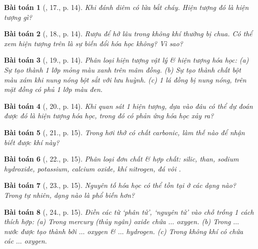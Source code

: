 \documentclass{article}
\newtheorem{baitoan}{Bài toán}
\begin{document}
\begin{baitoan}[\cite{An_Hoa_Hoc_nang_cao_8_9}, 17., p. 14]
	Khi đánh diêm có lửa bắt cháy. Hiện tượng đó là hiện tượng gì?
\end{baitoan}

\begin{baitoan}[\cite{An_Hoa_Hoc_nang_cao_8_9}, 18., p. 14]
	Rượu để hở lâu trong không khí thường bị chua. Có thể xem hiện tượng trên là sự biến đổi hóa học không? Vì sao?
\end{baitoan}

\begin{baitoan}[\cite{An_Hoa_Hoc_nang_cao_8_9}, 19., p. 14]
	Phân loại hiện tượng vật lý \& hiện tượng hóa học: (a) Sự tạo thành 1 lớp mỏng màu xanh trên mâm đồng. (b) Sự tạo thành chất bột màu xám khi nung nóng bột sắt với lưu huỳnh. (c) 1 lá đồng bị nung nóng, trên mặt đồng có phủ 1 lớp màu đen.
\end{baitoan}

\begin{baitoan}[\cite{An_Hoa_Hoc_nang_cao_8_9}, 20., p. 14]
	Khi quan sát 1 hiện tượng, dựa vào đâu có thể dự đoán được đó là hiện tượng hóa học, trong đó có phản ứng hóa học xảy ra?
\end{baitoan}

\begin{baitoan}[\cite{An_Hoa_Hoc_nang_cao_8_9}, 21., p. 15]
	Trong hơi thở có chất carbonic, làm thế nào để nhận biết được khí này?
\end{baitoan}

\begin{baitoan}[\cite{An_Hoa_Hoc_nang_cao_8_9}, 22., p. 15]
	Phân loại đơn chất \& hợp chất: silic, than, sodium hydroxide, potassium, calcium oxide, khí nitrogen, đá vôi {\rm{}}.
\end{baitoan}

\begin{baitoan}[\cite{An_Hoa_Hoc_nang_cao_8_9}, 23., p. 15]
	Nguyên tố hóa học có thể tồn tại ở các dạng nào? Trong tự nhiên, dạng nào là phổ biến hơn?
\end{baitoan}

\begin{baitoan}[\cite{An_Hoa_Hoc_nang_cao_8_9}, 24., p. 15]
	Điền các từ `phân tử', `nguyên tử' vào chỗ trống 1 cách thích hợp: (a) Trong mercury (thủy ngân) oxide chứa $\ldots$ oxygen. (b) Trong $\ldots$ nước được tạo thành bởi $\ldots$ oxygen \& $\ldots$ hydrogen. (c) Trong không khí có chứa các $\ldots$ oxygen.
\end{baitoan}
\end{document}
